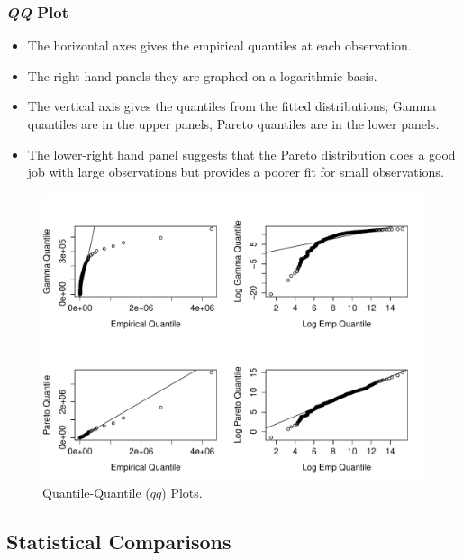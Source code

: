 \documentclass{beamer}
\begin{document}
\begin{frame}%
\frametitle{\textit{QQ} Plot}
\begin{itemize}
\item The horizontal axes gives the empirical quantiles at each observation.
\item The right-hand panels they are graphed on a logarithmic basis.
\item The vertical axis gives the quantiles from the fitted distributions; Gamma quantiles are in the upper panels, Pareto quantiles are in the lower panels.
\item The lower-right hand panel suggests that the Pareto distribution does a good job with large observations but provides a poorer fit for small observations.
\end{itemize}
\vspace{-.1in}
\begin{figure}[htp]
\begin{center}
    \includegraphics[width=.6\textwidth]{Figures/QQPlot.pdf}
     \caption{\label{F:QQPlot}Quantile-Quantile ($qq$) Plots.}
\end{center}
\end{figure}
\end{frame}

\subsection{Statistical Comparisons}
\end{document}
